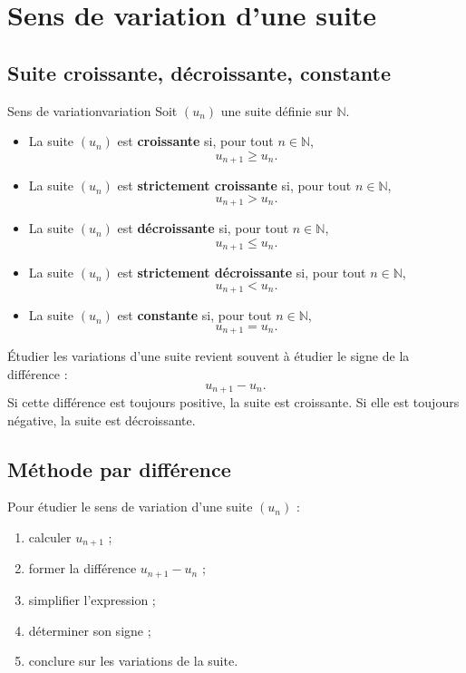 \documentclass[11pt,a4paper]{article}
\newcommand{\N}{\mathbb{N}}
\begin{document}
\section{Sens de variation d'une suite}

\subsection{Suite croissante, décroissante, constante}

\begin{definitionbox}{Sens de variation}{variation}
Soit $(u_n)$ une suite définie sur $\N$.
\begin{itemize}
  \item La suite $(u_n)$ est \textbf{croissante} si, pour tout $n\in\N$,
  \[
  u_{n+1}\geq u_n.
  \]
  \item La suite $(u_n)$ est \textbf{strictement croissante} si, pour tout $n\in\N$,
  \[
  u_{n+1}>u_n.
  \]
  \item La suite $(u_n)$ est \textbf{décroissante} si, pour tout $n\in\N$,
  \[
  u_{n+1}\leq u_n.
  \]
  \item La suite $(u_n)$ est \textbf{strictement décroissante} si, pour tout $n\in\N$,
  \[
  u_{n+1}<u_n.
  \]
  \item La suite $(u_n)$ est \textbf{constante} si, pour tout $n\in\N$,
  \[
  u_{n+1}=u_n.
  \]
\end{itemize}
\end{definitionbox}

\begin{rememberbox}
Étudier les variations d'une suite revient souvent à étudier le signe de la différence :
\[
 u_{n+1}-u_n.
\]
Si cette différence est toujours positive, la suite est croissante. Si elle est toujours négative, la suite est décroissante.
\end{rememberbox}

\subsection{Méthode par différence}

\begin{methodbox}
Pour étudier le sens de variation d'une suite $(u_n)$ :
\begin{enumerate}
  \item calculer $u_{n+1}$ ;
  \item former la différence $u_{n+1}-u_n$ ;
  \item simplifier l'expression ;
  \item déterminer son signe ;
  \item conclure sur les variations de la suite.
\end{enumerate}
\end{methodbox}
\end{document}
